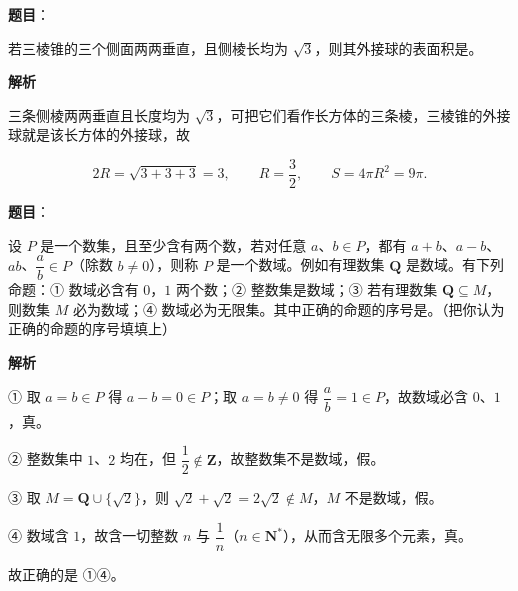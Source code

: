 \begin{answer}

\textbf{题目}：

若三棱锥的三个侧面两两垂直，且侧棱长均为 $\sqrt3$，则其外接球的表面积是\gkblank{}。

\textbf{解析}

三条侧棱两两垂直且长度均为 $\sqrt3$，可把它们看作长方体的三条棱，三棱锥的外接球就是该长方体的外接球，故

\nopagebreak[4]
\[2R=\sqrt{3+3+3}=3,\qquad R=\frac32,\qquad S=4\pi R^2=9\pi.\]


\end{answer}
\begin{answer}

\textbf{题目}：

设 $P$ 是一个数集，且至少含有两个数，若对任意 $a$、$b\in P$，都有 $a+b$、$a-b$、$ab$、$\dfrac ab\in P$（除数 $b\neq0$），则称 $P$ 是一个数域。例如有理数集 $\mathbf Q$ 是数域。有下列命题：① 数域必含有 $0$，$1$ 两个数；② 整数集是数域；③ 若有理数集 $\mathbf Q\subseteq M$，则数集 $M$ 必为数域；④ 数域必为无限集。其中正确的命题的序号是\gkblank{}。（把你认为正确的命题的序号填填上）

\textbf{解析}

① 取 $a=b\in P$ 得 $a-b=0\in P$；取 $a=b\neq0$ 得 $\dfrac ab=1\in P$，故数域必含 $0$、$1$，真。

② 整数集中 $1$、$2$ 均在，但 $\dfrac12\notin\mathbf Z$，故整数集不是数域，假。

③ 取 $M=\mathbf Q\cup\{\sqrt2\}$，则 $\sqrt2+\sqrt2=2\sqrt2\notin M$，$M$ 不是数域，假。

④ 数域含 $1$，故含一切整数 $n$ 与 $\dfrac1n$（$n\in\mathbf N^*$），从而含无限多个元素，真。

故正确的是 ①④。


\end{answer}
